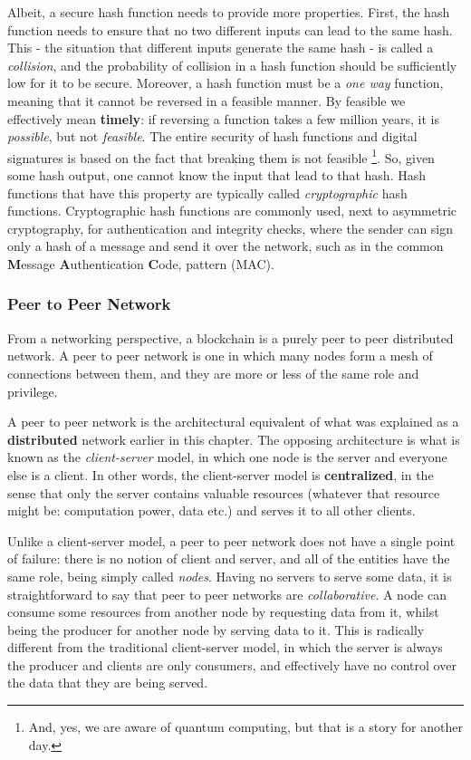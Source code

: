 Albeit, a secure hash function needs to provide more properties. First, the hash function needs to
ensure that no two different inputs can lead to the same hash. This - the situation that different
inputs generate the same hash - is called a \textit{collision}, and the probability of collision in
a hash function should be sufficiently low for it to be secure. Moreover, a hash function must be a
\textit{one way} function, meaning that it cannot be reversed in a feasible manner. By feasible we
effectively mean \textbf{timely}: if reversing a function takes a few million years, it is
\textit{possible}, but not \textit{feasible}. The entire security of hash functions and digital
signatures is based on the fact that breaking them is not feasible \footnote{And, yes, we are aware
of quantum computing, but that is a story for another day.}. So, given some hash output, one cannot
know the input that lead to that hash. Hash functions that have this property are typically called
\textit{cryptographic} hash functions. Cryptographic hash functions are commonly used, next to
asymmetric cryptography, for authentication and integrity checks, where the sender can sign only a
hash of a message and send it over the network, such as in the common \textbf{M}essage
\textbf{A}uthentication \textbf{C}ode, pattern \cite{bellareKeyingHashFunctions1996} (MAC).

\subsubsection{Peer to Peer Network} \label{chap_bg:subsec:p2p}

From a networking perspective, a blockchain is a purely peer to peer distributed network. A peer to
peer network is one in which many nodes form a mesh of connections between them, and they are more
or less of the same role and privilege.

A peer to peer network is the architectural equivalent of what was explained as a
\textbf{distributed} network earlier in this chapter. The opposing architecture is what is known as
the \textit{client-server} model, in which one node is the server and everyone else is a client. In
other words, the client-server model is \textbf{centralized}, in the sense that only the server
contains valuable resources (whatever that resource might be: computation power, data etc.) and
serves it to all other clients.

Unlike a client-server model, a peer to peer network does not have a single point of failure: there
is no notion of client and server, and all of the entities have the same role, being simply called
\textit{nodes}. Having no servers to serve some data, it is straightforward to say that peer to peer
networks are \textit{collaborative}. A node can consume some resources from another node by
requesting data from it, whilst being the producer for another node by serving data to it. This is
radically different from the traditional client-server model, in which the server is always the
producer and clients are only consumers, and effectively have no control over the data that they are
being served.

